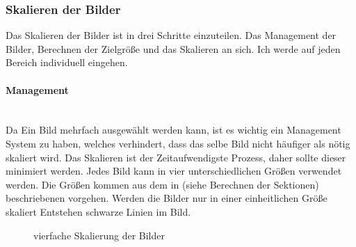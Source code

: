 \newpage

\subsubsection{Skalieren der Bilder}
Das Skalieren der Bilder ist in drei Schritte einzuteilen. Das Management der Bilder, Berechnen der Zielgröße und das Skalieren an sich. Ich werde auf jeden Bereich individuell eingehen.

\paragraph{Management}\mbox{}\\
Da Ein Bild mehrfach ausgewählt werden kann, ist es wichtig ein Management System zu haben, welches verhindert, dass das selbe Bild nicht häufiger als nötig skaliert wird. Das Skalieren ist der Zeitaufwendigste Prozess, daher sollte dieser minimiert werden. Jedes Bild kann in vier unterschiedlichen Größen verwendet werden. Die Größen kommen aus dem in (siehe Berechnen der Sektionen) beschriebenen vorgehen. Werden die Bilder nur in einer einheitlichen Größe skaliert Entstehen schwarze Linien im Bild.

\begin{figure}[h]
    \centering
    \caption[Schwarze Linien]{vierfache Skalierung der Bilder}
\end{figure}


